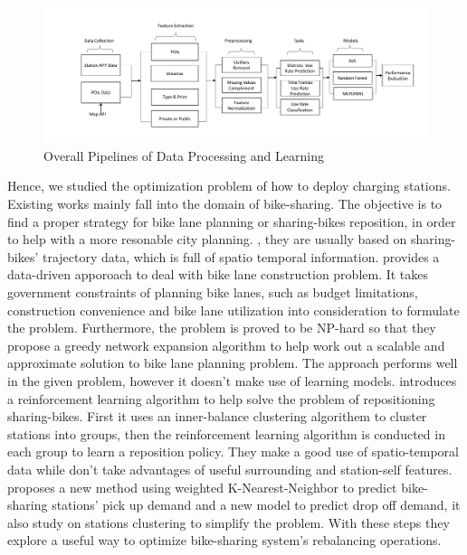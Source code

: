 \begin{figure}[!htp]
	\includegraphics[width=2\columnwidth]{./figures/pipeline.pdf}
	\centering
	\caption{Overall Pipelines of Data Processing and Learning}
	\label{fig2}
\end{figure}

Hence, we studied the optimization problem of how to deploy charging stations. Existing works \cite{Bao:2017,Liu:2018:DSB,Yang:2016:MMP,Li:2018:DBR,Liu:2016:RB} mainly fall into the domain of bike-sharing. The objective is to find a proper strategy for bike lane planning or sharing-bikes reposition, in order to help with a more resonable city planning. \cite{Bao:2016,Chen:2011,Jiang:2016,Li:2016}, they are usually based on sharing-bikes' trajectory data, which is full of spatio temporal information. \cite{Bao:2017} provides a data-driven apporoach to deal with bike lane construction problem. It takes government constraints of planning bike lanes, such as budget limitations, construction convenience and bike lane utilization into consideration to formulate the problem. Furthermore, the problem is proved to be NP-hard so that they propose a greedy network expansion algorithm to help work out a scalable and approximate solution to bike lane planning problem. The approach performs well in the given problem, however it doesn't make use of learning models. \cite{Li:2018:DBR} introduces a reinforcement learning algorithm to help solve the problem of repositioning sharing-bikes. First it uses an inner-balance clustering algorithem to cluster stations into groups, then the reinforcement learning algorithm is conducted in each group to learn a reposition policy. They make a good use of spatio-temporal data while don't take advantages of useful surrounding and station-self features. \cite{Liu:2016:RB} proposes a new method using weighted K-Nearest-Neighbor to predict bike-sharing stations' pick up demand and a new model to predict drop off demand, it also study on stations clustering to simplify the problem. With these steps they explore a useful way to optimize bike-sharing system's rebalancing operations.

